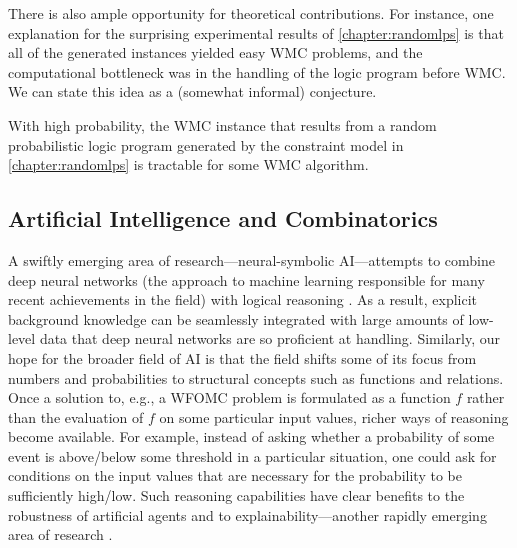 There is also ample opportunity for theoretical contributions. For instance, one
explanation for the surprising experimental results of \cref{chapter:randomlps}
is that all of the generated instances yielded easy WMC problems, and the
computational bottleneck was in the handling of the logic program before WMC\@.
We can state this idea as a (somewhat informal) conjecture.

\begin{conjecture}
  With high probability, the WMC instance that results from a random
  probabilistic logic program generated by the constraint model in
  \cref{chapter:randomlps} is tractable for some WMC algorithm.
\end{conjecture}


\subsection{Artificial Intelligence and Combinatorics}

A swiftly emerging area of research---neural-symbolic AI---attempts to combine
deep neural networks (the approach to machine learning responsible for many
recent achievements in the field) with logical reasoning
\citep{DBLP:conf/ijcai/RaedtDMM20,garnelo2019reconciling,DBLP:series/faia/342}.
As a result, explicit background knowledge can be seamlessly integrated with
large amounts of low-level data that deep neural networks are so proficient at
handling. Similarly, our hope for the broader field of AI is that the field
shifts some of its focus from numbers and probabilities to structural concepts
such as functions and relations. Once a solution to, e.g., a WFOMC problem is
formulated as a function $f$ rather than the evaluation of $f$ on some
particular input values, richer ways of reasoning become available. For example,
instead of asking whether a probability of some event is above/below some
threshold in a particular situation, one could ask for conditions on the input
values that are necessary for the probability to be sufficiently high/low. Such
reasoning capabilities have clear benefits to the robustness of artificial
agents and to explainability---another rapidly emerging area of research
\citep{DBLP:journals/corr/abs-1909-03012,DBLP:journals/fdata/BelleP21,DBLP:journals/corr/abs-2202-10335}.

